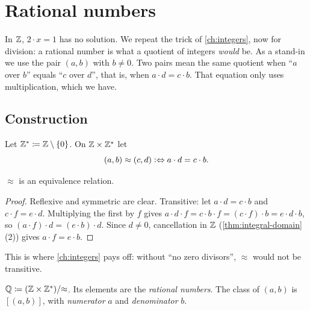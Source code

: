 \chapter{Rational numbers}
\label{ch:rationals}

In $\mathbb{Z}$, $2 \cdot x = 1$ has no solution. We repeat the trick of
\cref{ch:integers}, now for division: a rational number is what a quotient of
integers \emph{would} be. As a stand-in we use the pair $(a, b)$ with $b \neq 0$.
Two pairs mean the same quotient when \enquote{$a$ over $b$} equals \enquote{$c$
over $d$}, that is, when $a \cdot d = c \cdot b$. That equation only uses
multiplication, which we have.

\section{Construction}

\begin{definition}
\label{def:rational-relation}
Let $\mathbb{Z}^\ast \coloneqq \mathbb{Z} \setminus \lbrace 0 \rbrace$. On $\mathbb{Z} \times \mathbb{Z}^\ast$ let
\[
  (a, b) \approx (c, d) \mathrel{\vcentcolon\Leftrightarrow} a \cdot d = c \cdot b.
\]
\end{definition}

\begin{lemma}
\label{lem:rational-equivalence}
$\approx$ is an equivalence relation.
\end{lemma}

\begin{proof}
Reflexive and symmetric are clear. Transitive: let $a \cdot d = c \cdot b$ and $c
\cdot f = e \cdot d$. Multiplying the first by $f$ gives $a \cdot d \cdot f = c
\cdot b \cdot f = (c \cdot f) \cdot b = e \cdot d \cdot b$, so $(a \cdot f) \cdot d
= (e \cdot b) \cdot d$. Since $d \neq 0$, cancellation in $\mathbb{Z}$
(\cref{thm:integral-domain}(2)) gives $a \cdot f = e \cdot b$.
\end{proof}

This is where \cref{ch:integers} pays off: without \enquote{no zero divisors},
$\approx$ would not be transitive.

\begin{definition}
\label{def:rationals}
$\mathbb{Q} \coloneqq (\mathbb{Z} \times \mathbb{Z}^\ast)/{\approx}$. Its elements are the \emph{rational
numbers}. The class of $(a, b)$ is $[(a, b)]$, with \emph{numerator} $a$ and
\emph{denominator} $b$.
\end{definition}

